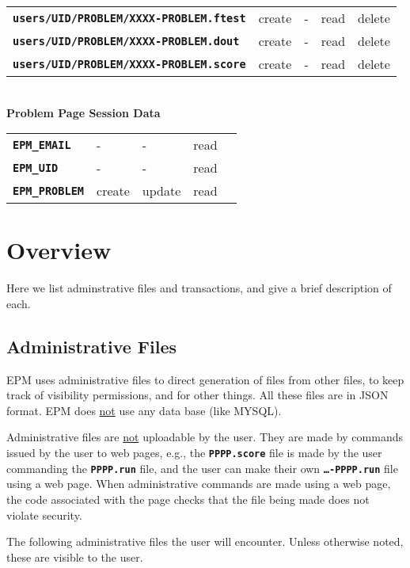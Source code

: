 \documentclass[12pt]{article}
\newcommand{\TT}[1]{{\tt \bfseries #1}}
\begin{document}
\begin{center}
\begin{tabular}{lllll}
\TT{users/UID/PROBLEM/XXXX-PROBLEM.ftest}& create  & -      & read & delete \\
\TT{users/UID/PROBLEM/XXXX-PROBLEM.dout}& create  & -      & read & delete \\
\TT{users/UID/PROBLEM/XXXX-PROBLEM.score}& create  & -      & read & delete \\
\end{tabular}
\\[3ex]
{\bf Problem Page Session Data}
\\[1ex]
\begin{tabular}{lllll}
\TT{EPM\_EMAIL}	& -       & -      & read \\
\TT{EPM\_UID}	& -       & -      & read \\
\TT{EPM\_PROBLEM}
		& create  & update & read \\
\end{tabular}
\end{center}

\section{Overview}

Here we list adminstrative files and transactions, and give a
brief description of each.

\subsection{Administrative Files}

EPM uses administrative files to direct generation of files from
other files, to keep track of visibility
permissions, and for other things.  All these files are in JSON
format.  EPM does \underline{not} use any data base (like MYSQL).

Administrative files are \underline{not} uploadable by the user.
They are made by commands issued by the user to web pages, e.g.,
the \TT{PPPP.score} file is made by the user commanding
the \TT{PPPP.run} file, and the user can make their own
\TT{\ldots-PPPP.run} file using a web page.  When administrative
commands are made using a web page, the code associated with the
page checks that the file being made does not violate security.

The following administrative files the user will encounter.
Unless otherwise noted, these are visible to the user.
\end{document}

